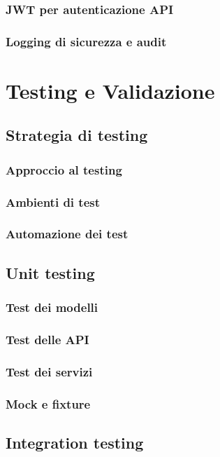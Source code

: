 \documentclass[12pt,a4paper,oneside]{report}
\begin{document}
\subsection{JWT per autenticazione API}
\subsection{Logging di sicurezza e audit}





\chapter{Testing e Validazione}
\section{Strategia di testing}
\subsection{Approccio al testing}
\subsection{Ambienti di test}
\subsection{Automazione dei test}

\section{Unit testing}
\subsection{Test dei modelli}
\subsection{Test delle API}
\subsection{Test dei servizi}
\subsection{Mock e fixture}

\section{Integration testing}
\end{document}
